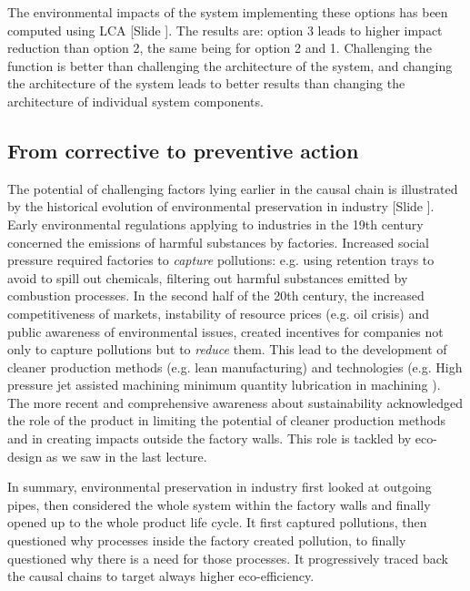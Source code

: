 \documentclass{article}
\newcounter{slide}
\begin{document}
The environmental impacts of the system implementing these options has been computed using LCA {\color{blue}[Slide ]}. The results are: option 3 leads to higher impact reduction than option 2, the same being for option 2 and 1. Challenging the function is better than challenging the architecture of the system, and changing the architecture of the system leads to better results than changing the architecture of individual system components.

\subsection{From corrective to preventive action}
\label{sec:endofpipe}
The potential of challenging factors lying earlier in the causal chain is illustrated by the historical evolution of environmental preservation in industry {\color{blue}[Slide ]}. Early environmental regulations applying to industries in the 19th century concerned the emissions of harmful substances by factories. Increased social pressure required factories to \emph{capture} pollutions: e.g. using retention trays to avoid to spill out chemicals, filtering out harmful substances emitted by combustion processes. In the second half of the 20th century, the increased competitiveness of markets, instability of resource prices (e.g. oil crisis) and public awareness of environmental issues, created incentives for companies not only to capture pollutions but to \emph{reduce} them. This lead to the development of cleaner production methods (e.g. lean manufacturing) and technologies (e.g. High pressure jet assisted machining \cite{pusavecTransitioningSustainableProduction2010} minimum quantity lubrication in machining \cite{lawalCriticalAssessmentLubrication2013}). The more recent and comprehensive awareness about sustainability acknowledged the role of the product in limiting the potential of cleaner production methods and in creating impacts outside the factory walls. This role is tackled by eco-design as we saw in the last lecture. 

In summary, environmental preservation in industry first looked at outgoing pipes, then considered the whole system within the factory walls and finally opened up to the whole product life cycle. It first captured pollutions, then questioned why processes inside the factory created pollution, to finally questioned why there is a need for those processes. It progressively traced back the causal chains to target always higher eco-efficiency. 
\end{document}
